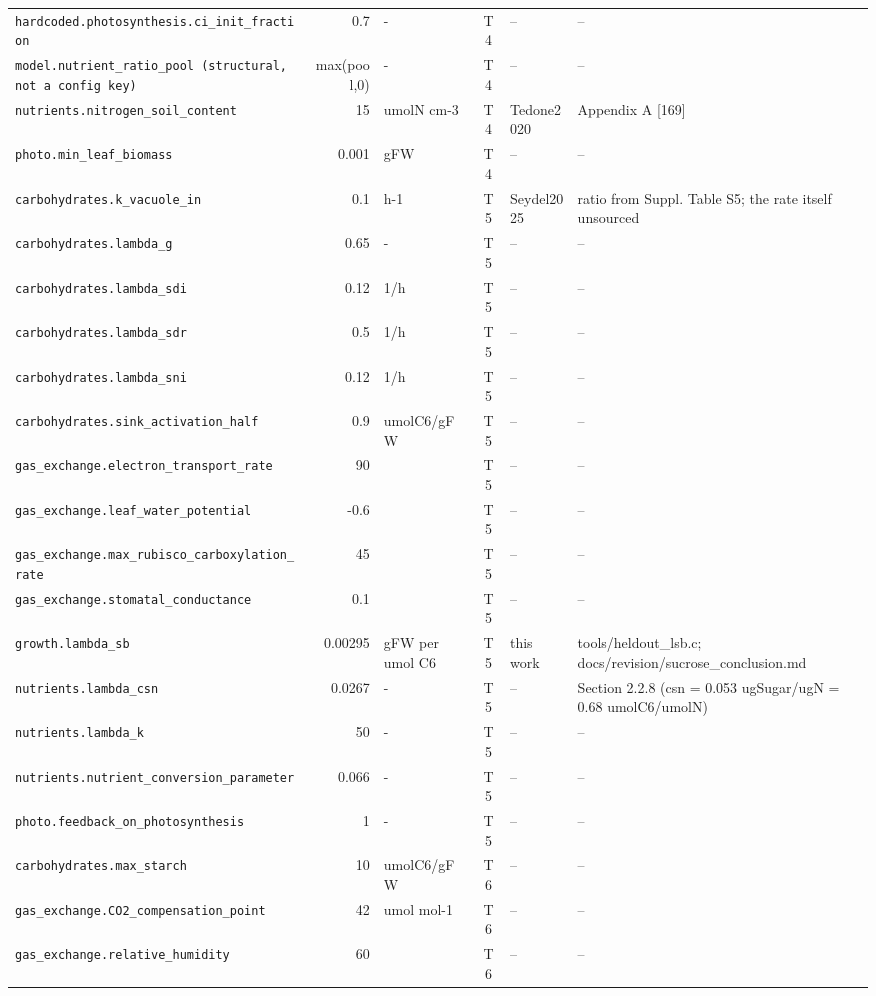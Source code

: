 \documentclass[a4paper,11pt]{article}
\begin{document}
\begin{table}[!htbp]
\begin{tabular}{@{}p{52mm}rp{20mm}cp{20mm}p{38mm}@{}}
\texttt{hardcoded.photosynthesis.ci\_init\_fraction} & 0.7 & - & T4 & -- & -- \\
\texttt{model.nutrient\_ratio\_pool (structural, not a config key)} & max(pool,0) & - & T4 & -- & -- \\
\texttt{nutrients.nitrogen\_soil\_content} & 15 & umolN cm-3 & T4 & Tedone2020 & Appendix A [169] \\
\texttt{photo.min\_leaf\_biomass} & 0.001 & gFW & T4 & -- & -- \\
\texttt{carbohydrates.k\_vacuole\_in} & 0.1 & h-1 & T5 & Seydel2025 & ratio from Suppl. Table S5; the rate itself unsourced \\
\texttt{carbohydrates.lambda\_g} & 0.65 & - & T5 & -- & -- \\
\texttt{carbohydrates.lambda\_sdi} & 0.12 & 1/h & T5 & -- & -- \\
\texttt{carbohydrates.lambda\_sdr} & 0.5 & 1/h & T5 & -- & -- \\
\texttt{carbohydrates.lambda\_sni} & 0.12 & 1/h & T5 & -- & -- \\
\texttt{carbohydrates.sink\_activation\_half} & 0.9 & umolC6/gFW & T5 & -- & -- \\
\texttt{gas\_exchange.electron\_transport\_rate} & 90 &  & T5 & -- & -- \\
\texttt{gas\_exchange.leaf\_water\_potential} & -0.6 &  & T5 & -- & -- \\
\texttt{gas\_exchange.max\_rubisco\_carboxylation\_rate} & 45 &  & T5 & -- & -- \\
\texttt{gas\_exchange.stomatal\_conductance} & 0.1 &  & T5 & -- & -- \\
\texttt{growth.lambda\_sb} & 0.00295 & gFW per umol C6 & T5 & this work & tools/heldout\_lsb.c; docs/revision/sucrose\_conclusion.md \\
\texttt{nutrients.lambda\_csn} & 0.0267 & - & T5 & -- & Section 2.2.8 (csn = 0.053 ugSugar/ugN = 0.68 umolC6/umolN) \\
\texttt{nutrients.lambda\_k} & 50 & - & T5 & -- & -- \\
\texttt{nutrients.nutrient\_conversion\_parameter} & 0.066 & - & T5 & -- & -- \\
\texttt{photo.feedback\_on\_photosynthesis} & 1 & - & T5 & -- & -- \\
\texttt{carbohydrates.max\_starch} & 10 & umolC6/gFW & T6 & -- & -- \\
\texttt{gas\_exchange.CO2\_compensation\_point} & 42 & umol mol-1 & T6 & -- & -- \\
\texttt{gas\_exchange.relative\_humidity} & 60 &  & T6 & -- & -- \\

\end{tabular}
\end{table}
\end{document}
